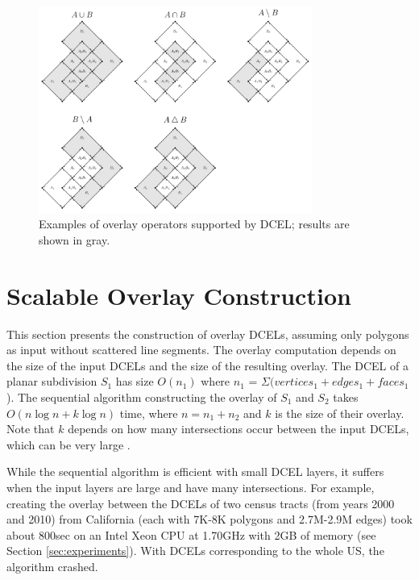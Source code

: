 \begin{figure}
    \centering
    \includegraphics[width=0.8\textwidth]{chapterSDCEL/dcel_operators.pdf}
    \caption{Examples of overlay operators supported by DCEL; results are shown in gray.}
    \label{fig:dcel_operators}
\end{figure}

\section{Scalable Overlay Construction} \label{sec:methods}

This section presents the construction of overlay DCELs, assuming only polygons as input without scattered line segments. The overlay computation depends on the 
size of the input DCELs and the size of the resulting overlay. The DCEL of a planar subdivision $S_1$ has size $O(n_1)$ where $n_1$ = $\Sigma (vertices_1 + 
edges_1 + faces_1$).  The sequential algorithm constructing the overlay of $S_1$ and $S_2$ takes $O(n \log n + k \log n)$ time, where $n = n_1 + n_2$ and $k$ is 
the size of their overlay.  Note that $k$ depends on how many intersections occur between the input DCELs, which can be very large 
\cite{berg_computational_2008}. 

While the sequential algorithm is efficient with small DCEL layers, it suffers when the input layers are large and have many intersections. For example, 
creating the overlay between the DCELs of two census tracts (from years 2000 and 2010) from California (each with 7K-8K polygons and 2.7M-2.9M edges) took about 
800sec on an Intel Xeon CPU at 1.70GHz  with 2GB of memory (see Section \ref{sec:experiments}). With DCELs corresponding to the whole US, the algorithm 
crashed. 

